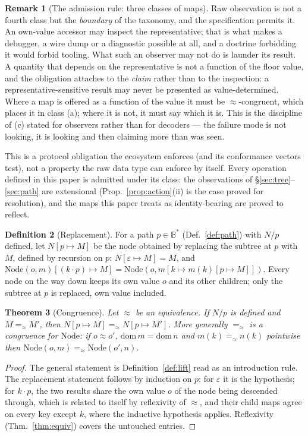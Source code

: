 \documentclass[11pt]{article}
\newtheorem{theorem}{Theorem}[section]
\theoremstyle{definition}
\newtheorem{definition}[theorem]{Definition}
\newtheorem{remark}[theorem]{Remark}
\newcommand{\Bytes}{\mathbb{B}}                    %
\newcommand{\dom}{\mathrm{dom}\,}
\newcommand{\eqS}{=_{\approx}}                     %
\begin{document}
\begin{remark}[The admission rule: three classes of maps]
Raw observation is not a fourth class but the \emph{boundary} of the taxonomy, and the
specification permits it. An own-value accessor may inspect the representative;
that is what makes a debugger, a wire dump or a diagnostic possible at all, and a doctrine
forbidding it would forbid tooling. What such an observer may not do is launder its result.
A quantity that depends on the representative is not a function of the floor value, and the
obligation attaches to the \emph{claim} rather than to the inspection: a
representative-sensitive result may never be presented as value-determined. Where a map is
offered as a function of the value it must be $\approx$-congruent, which places it in class
(a); where it is not, it must say which it is. This is the discipline of (c) stated for
observers rather than for decoders --- the failure mode is not looking, it is looking and
then claiming more than was seen.

This is a protocol obligation the ecosystem enforces (and its conformance vectors
test), not a property the raw data type can enforce by itself. Every operation
defined in this paper is admitted under its class: the observations of
\S\ref{sec:tree}--\ref{sec:path} are extensional (Prop.~\ref{prop:action}(ii) is the
case proved for resolution), and the maps this paper treats as identity-bearing are
proved to reflect.
\end{remark}

\begin{definition}[Replacement]\label{def:replace}
For a path $p \in \Bytes^{*}$ (Def.~\ref{def:path}) with $N/p$ defined, let
$N[p \mapsto M]$ be the node obtained by replacing the subtree at $p$ with $M$,
defined by recursion on $p$: $N[\varepsilon \mapsto M] = M$, and
$\mathrm{Node}(o, m)[(k \cdot p) \mapsto M] = \mathrm{Node}(o, m[k \mapsto m(k)[p \mapsto
M]])$. Every node on the way down keeps its own value $o$ and its other children; only
the subtree at $p$ is replaced, own value included.
\end{definition}

\begin{theorem}[Congruence]\label{thm:congruence}
Let $\approx$ be an equivalence. If $N/p$ is defined and $M \eqS M'$, then
$N[p \mapsto M] \eqS N[p \mapsto M']$. More generally $\eqS$ is a congruence for
$\mathrm{Node}$: if $o \approx o'$, $\dom m = \dom n$ and $m(k) \eqS n(k)$ pointwise
then $\mathrm{Node}(o, m) \eqS \mathrm{Node}(o', n)$.
\end{theorem}

\begin{proof}
The general statement is Definition~\ref{def:lift} read as an introduction rule. The
replacement statement follows by induction on $p$: for $\varepsilon$ it is the
hypothesis; for $k \cdot p$, the two results share the own value $o$ of the node being
descended through, which is related to itself by reflexivity of $\approx$, and their child
maps agree on every key except $k$, where the inductive hypothesis applies. Reflexivity
(Thm.~\ref{thm:equiv}) covers the untouched entries.
\end{proof}
\end{document}
